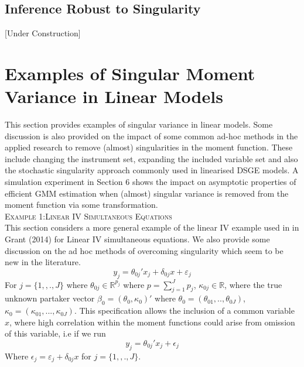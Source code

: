 \documentclass[11pt, fleqn]{article}
\begin{document}
\subsection{Inference Robust to Singularity}
[Under Construction]




\section{Examples of Singular Moment Variance in Linear Models}

This section provides examples of singular variance in linear models. Some discussion is also provided on the impact of some common ad-hoc methods in the applied research to remove (almost) singularities in the moment function. These include changing the instrument set, expanding the included variable set and also the stochastic singularity approach commonly used in linearised DSGE models. A simulation experiment in Section 6 shows the impact on asymptotic properties of efficient GMM estimation when (almost) singular variance is removed from the moment function via some transformation.\\

\textsc{Example 1:Linear IV Simultaneous Equations}\\

 This section considers a more general example of the linear IV example used in in Grant (2014) for Linear IV simultaneous equations. We also provide some discussion on the ad hoc methods of overcoming singularity which seem to be new in the literature.
\begin{equation} \label{eqn1} y_j=\theta_{0j}'x_{j}+\delta_{0j} x +\varepsilon_j\end{equation}
For $j=\{1,,.,J\}$ where $\theta_{0j}\in \mathbb{R}^{p_j}$ where $p=\sum_{j=1}^J p_j$, $\kappa_{0j}\in\mathbb{R}$, where  the true unknown partaker vector $\beta_0=(\theta_{0},\kappa_0)'$ where $\theta_0=(\theta_{01},..,\theta_{0J})$, $\kappa_0=(\kappa_{01},...,\kappa_{0J})$.
This specification allows the inclusion of a common variable $x$, where high correlation within the moment functions could arise from omission  of this variable, i.e if we run
 \begin{equation}\label{omit1} y_j=\theta_{0j}'x_{j}+\epsilon_j\end{equation}
 Where $\epsilon_j=\varepsilon_j+\delta_{0j}x$ for $j=\{1,,.,J\}$.
\end{document}
